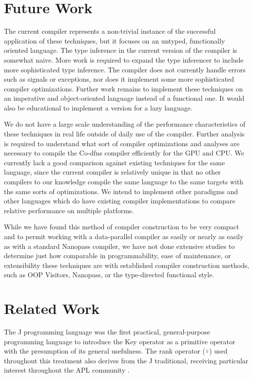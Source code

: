 \documentclass[numbers,preprint]{sigplanconf}
\begin{document}
\section{Future Work}

The current compiler represents a non-trivial instance of
the successful application of these techniques, but it focuses on an untyped, 
functionally oriented language. The type inference in the current version 
of the compiler is somewhat naive. More work is required to expand the 
type inferencer to include more sophisticated type inference. 
The compiler does not currently handle errors such as signals or 
exceptions, nor does it implement some more sophisticated compiler optimizations.
Further work remains to implement these techniques on an imperative and 
object-oriented language instead of a functional one. It would also be 
educational to implement a version for a lazy language. 

We do not have a large scale understanding of the performance characteristics 
of these techniques in real life outside of daily use of the compiler.
Further analysis is
required to understand what sort of compiler optimizations and analyses are 
necessary to compile the Co-dfns compiler efficiently for the GPU and CPU. 
We currently lack a good comparison against existing techniques for the same 
language, since the current compiler is relatively unique in that no other 
compilers to our knowledge compile the same language to the same targets 
with the same sorts of optimizations. We intend to implement other paradigms 
and other languages which do have existing compiler implementations to compare 
relative performance on multiple platforms. 

While we have found this method of compiler construction to be very compact 
and to permit working with a data-parallel compiler as easily or nearly as 
easily as with a standard Nanopass compiler, we have not done extensive 
studies to determine just how comparable in programmability, ease of 
maintenance, or extensibility these techniques are with established 
compiler construction methods, such as OOP Visitors, Nanopass, or the 
type-directed functional style.

\section{Related Work}

The J programming language \cite{hui2014key} was the first practical,
general-purpose programming language to introduce the Key operator as a
primitive operator with the presumption of its general usefulness. The
rank operator (⍤) used throughout this treatment also derives from
the J traditional, receiving particular interest throughout the APL
community \cite{bernecky1987rank,hui1995rank}.
\end{document}

